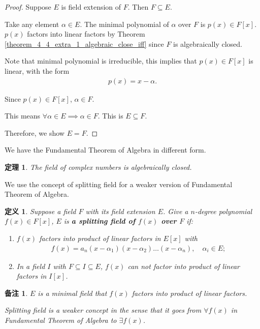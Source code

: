 \documentclass[utf8]{ctexbook}
\newtheorem{theorem}{定理}[section]
\newtheorem{definition}{定义}[section]
\newtheorem{memo}{备注}[section]
\begin{document}
\begin{proof}
Suppose $E$ is field extension of $F$. Then $F \subseteq E$.

Take any element $\alpha \in E$. The minimal polynomial of $\alpha$ over $F$ is $p(x) \in F[x]$. $p(x)$ factors into linear factors by Theorem \ref{theorem_4_4_extra_1_algebraic_close_iff} since $F$ is algebraically closed.

Note that minimal polynomial is irreducible, this implies that $p(x) \in F[x]$ is linear, with the form
\begin{align*}
p(x) = x- \alpha .
\end{align*}

Since $p(x) \in F[x]$, $\alpha \in F$.

This means $\forall \alpha \in E \implies \alpha \in F$. This is $E \subseteq F$.

Therefore, we show $E = F$.
\end{proof}

We have the Fundamental Theorem of Algebra in different form.

\begin{theorem}
\label{theorem_4_4_1_alternative_fundamental_thm_algebra}
The field of complex numbers is algebraically closed.
\end{theorem}


We use the concept of splitting field for a weaker version of Fundamental Theorem of Algebra.

\begin{definition}
\label{def_splitting_field}
Suppose a field $F$ with its field extension $E$. Give a $n$-degree polynomial $f(x) \in F[x]$, $E$ is \textbf{a splitting field of $f(x)$ over $F$} if:

\begin{enumerate}
\item{$f(x)$ factors into product of linear factors in $E[x]$ with
\begin{align*}
f(x) = a_n (x-\alpha_1)(x-\alpha_2) \ldots (x-\alpha_n), 
\quad \alpha_i \in E ;
\end{align*}
}
\item{In a field $I$ with $F \subseteq I \subseteq E$, $f(x)$ can not factor into product of linear factors in $I[x]$.}
\end{enumerate}

\end{definition}

\begin{memo}
$E$ is a minimal field that $f(x)$ factors into product of linear factors.

Splitting field is a weaker concept in the sense that it goes from $\forall f(x) $ in Fundamental Theorem of Algebra to $\exists f(x)$.
\end{memo}
\end{document}
